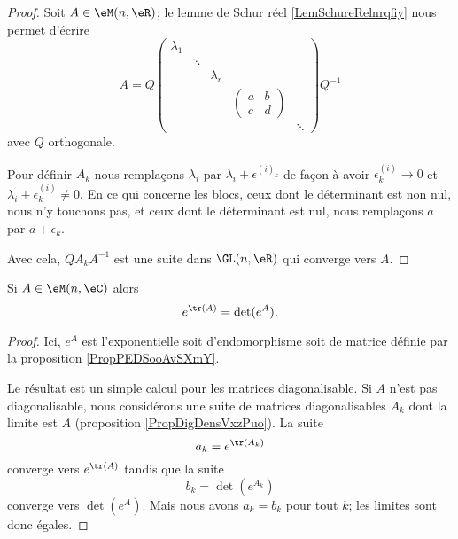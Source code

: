 \begin{proof}
    Soit \( A\in \eM(n,\eR)\); le lemme de Schur réel \ref{LemSchureRelnrqfiy} nous permet d'écrire
    \begin{equation}
        A=Q
        \begin{pmatrix}
            \lambda_1    &       &       &       &   \\  
                &   \ddots    &       &       &   \\  
                &       &  \lambda_r     &       &   \\  
                &  &     &   \begin{pmatrix}
                    a    &   b    \\ 
                    c    &   d    
                \end{pmatrix}&          \\  
                &       &       &       &   \ddots    
        \end{pmatrix}
        Q^{-1}
    \end{equation}
    avec \( Q\) orthogonale.

    Pour définir \( A_k\) nous remplaçons \( \lambda_i\) par \( \lambda_i+\epsilon^{(i)_k}\) de façon à avoir \( \epsilon^{(i)}_k\to 0\) et \( \lambda_i+\epsilon^{(i)}_k\neq 0\). En ce qui concerne les blocs, ceux dont le déterminant est non nul, nous n'y touchons pas, et ceux dont le déterminant est nul, nous remplaçons \( a\) par \( a+\epsilon_k\).

    Avec cela, \( QA_kA^{-1}\) est une suite dans \( \GL(n,\eR)\) qui converge vers \( A\).
\end{proof}

\begin{proposition}
    Si \( A\in\eM(n,\eC)\) alors
    \begin{equation}
        e^{\tr(A)}=\det( e^{A}).
    \end{equation}
\end{proposition}

\begin{proof}
    Ici, \( e^A\) est l'exponentielle soit d'endomorphisme soit de matrice définie par la proposition \ref{PropPEDSooAvSXmY}.

    Le résultat est un simple calcul pour les matrices diagonalisable. Si \( A\) n'est pas diagonalisable, nous considérons une suite de matrices diagonalisables \( A_k\) dont la limite est \( A\) (proposition \ref{PropDigDensVxzPuo}). La suite
    \begin{equation}
        a_k= e^{\tr(A_k)}
    \end{equation}
    converge vers \(  e^{\tr(A)}\) tandis que la suite 
    \begin{equation}
        b_k=\det( e^{A_k})
    \end{equation}
    converge vers \( \det( e^{A})\). Mais nous avons \( a_k=b_k\) pour tout \( k\); les limites sont donc égales.
\end{proof}

